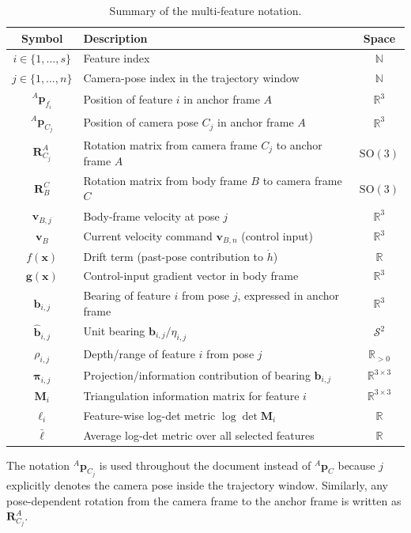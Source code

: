\documentclass[11pt,a4paper]{article}
\newcommand{\R}{\mathbb{R}}
\newcommand{\SO}{\mathrm{SO}(3)}
\begin{document}
\begin{table}[h]
\centering
\renewcommand{\arraystretch}{1.25}
\begin{tabular}{clc}
\toprule
\textbf{Symbol} & \textbf{Description} & \textbf{Space} \\
\midrule
$i\in\{1,\ldots,s\}$ & Feature index & $\mathbb{N}$ \\
$j\in\{1,\ldots,n\}$ & Camera-pose index in the trajectory window & $\mathbb{N}$ \\
${}^{A}\bm{p}_{f_i}$ & Position of feature $i$ in anchor frame $A$ & $\R^3$ \\
${}^{A}\bm{p}_{C_j}$ & Position of camera pose $C_j$ in anchor frame $A$ & $\R^3$ \\
$\bm{R}_{C_j}^{A}$ & Rotation matrix from camera frame $C_j$ to anchor frame $A$ & $\SO$ \\
$\bm{R}_{B}^{C}$ & Rotation matrix from body frame $B$ to camera frame $C$ & $\SO$ \\
$\bm{v}_{B,j}$ & Body-frame velocity at pose $j$ & $\R^3$ \\
$\bm{v}_{B}$ & Current velocity command $\bm{v}_{B,n}$ (control input) & $\R^3$ \\
$f(\bm{x})$ & Drift term (past-pose contribution to $\dot{h}$) & $\R$ \\
$\bm{g}(\bm{x})$ & Control-input gradient vector in body frame & $\R^3$ \\
$\bm{b}_{i,j}$ & Bearing of feature $i$ from pose $j$, expressed in anchor frame & $\R^3$ \\
$\hat{\bm{b}}_{i,j}$ & Unit bearing $\bm{b}_{i,j}/\eta_{i,j}$ & $\mathcal{S}^2$ \\
$\rho_{i,j}$ & Depth/range of feature $i$ from pose $j$ & $\R_{>0}$ \\
$\bm{\pi}_{i,j}$ & Projection/information contribution of bearing $\bm{b}_{i,j}$ & $\R^{3\times3}$ \\
$\bm{M}_{i}$ & Triangulation information matrix for feature $i$ & $\R^{3\times3}$ \\
$\ell_i$ & Feature-wise log-det metric $\log\det\bm{M}_i$ & $\R$ \\
$\bar{\ell}$ & Average log-det metric over all selected features & $\R$ \\
\bottomrule
\end{tabular}
\caption{Summary of the multi-feature notation.}
\label{tab:notation}
\end{table}

The notation ${}^{A}\bm{p}_{C_j}$ is used throughout the document instead of
${}^{A}\bm{p}_{C}$ because $j$ explicitly denotes the camera pose inside the
trajectory window.  Similarly, any pose-dependent rotation from the camera
frame to the anchor frame is written as $\bm{R}_{C_j}^{A}$.
\end{document}
